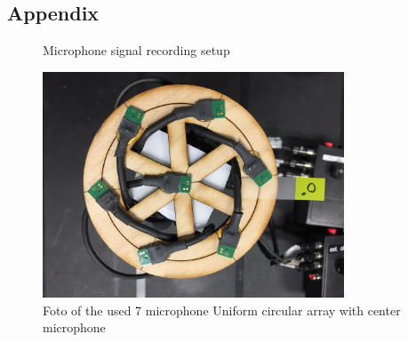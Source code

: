 \begin{appendix}

\chapter{Appendix}
\label{chap:Appendix}





\begin{figure}[!ht]
	\centering
    \def\svgwidth{.8\linewidth}
    \small
	\caption{Microphone signal recording setup}
	\label{fig:mic_rec_setup}
\end{figure}

\begin{figure}[!ht]
	\centering
	\includegraphics[width=0.8\textwidth]{figures/mic_array_foto.jpg}
	\caption{Foto of the used 7 microphone Uniform circular array with center microphone}
	\label{fig:mic_array}
\end{figure}


\end{appendix}
